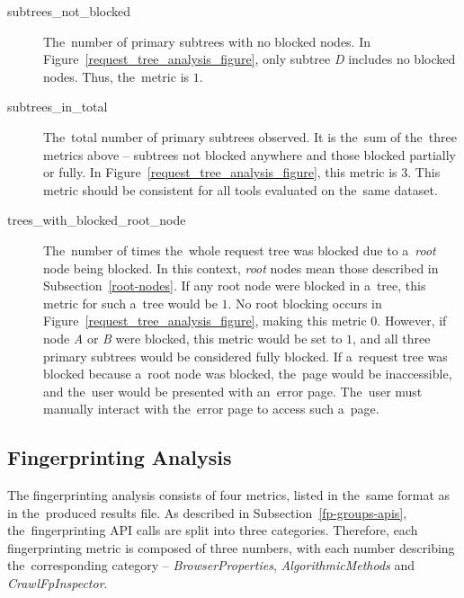\begin{description}
\begin{description}
\item[subtrees\_not\_blocked] The~number of primary subtrees with no blocked nodes. In Figure~\ref{request_tree_analysis_figure}, only subtree \textit{D} includes no blocked nodes. Thus, the~metric is $1$.

\item[subtrees\_in\_total] The~total number of primary subtrees observed. It is the~sum of the~three metrics above -- subtrees not blocked anywhere and those blocked partially or fully. In Figure~\ref{request_tree_analysis_figure}, this metric is $3$. This metric should be consistent for all tools evaluated on the~same dataset.

\item[trees\_with\_blocked\_root\_node] The~number of times the~whole request tree was blocked due to a~\textit{root} node being blocked. In this context, \textit{root} nodes mean those described in Subsection~\ref{root-nodes}. If any root node were blocked in a~tree, this metric for such a~tree would be $1$. No root blocking occurs in Figure~\ref{request_tree_analysis_figure}, making this metric $0$. However, if node \emph{A} or \emph{B} were blocked, this metric would be set to $1$, and all three primary subtrees would be considered fully blocked. If a~request tree was blocked because a~root node was blocked, the~page would be inaccessible, and the~user would be presented with an~error page. The~user must manually interact with the~error page to access such a~page.
\end{description}

\end{description}

\subsection{Fingerprinting Analysis}
\label{metrics-fpd-section}
The fingerprinting analysis consists of four metrics, listed in the~same format as in the~produced results file. As described in Subsection~\ref{fp-groups-apis}, the~fingerprinting API calls are split into three categories. Therefore, each fingerprinting metric is composed of three numbers, with each number describing the~corresponding category -- \textit{BrowserProperties}, \textit{AlgorithmicMethods} and \textit{CrawlFpInspector}.

